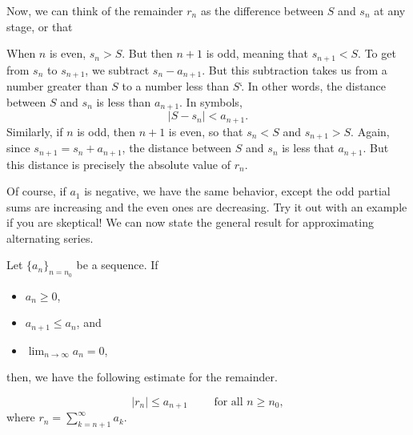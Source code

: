 \documentclass{ximera}
\begin{document}
\begin{model}
Now, we can think of the remainder $r_n$ as the difference between $S$ and $s_n$ at any stage, or that
\begin{image}
  \end{image}
When $n$ is even, $s_n > S$.  But then $n+1$ is odd, meaning that $s_{n+1} < S$.  To get from $s_n$ to $s_{n+1}$, we subtract $s_n - a_{n+1}$.  But this subtraction takes us from a number greater than $S$ to a number less than $S$`.  In other words, the distance between $S$ and $s_n$ is less than $a_{n+1}$.  In symbols, 
\[
\vert S - s_n \vert < a_{n+1}.
\]
Similarly, if $n$ is odd, then $n+1$ is even, so that $s_n < S$ and $s_{n+1} > S$.  Again, since $s_{n+1} = s_n + a_{n+1}$, the distance between $S$ and $s_n$ is less that $a_{n+1}$.  But this distance is precisely the absolute value of $r_n$.

\end{model}

Of course, if $a_1$ is negative, we have the same behavior, except the odd partial sums are increasing and the even ones are decreasing.  Try it out with an example if you are skeptical!  We can now state the general result for approximating alternating series.

\begin{theorem}
Let $\{a_n\}_{n=n_0}$ be a sequence.  If

\begin{itemize}
\item $a_n \geq 0$,
\item $a_{n+1} \leq a_n$, and
\item $\lim_{n \to\infty} a_n=0$, 
\end{itemize}

then, we have the following estimate for the remainder.

\[
\big| r_n \big| \leq a_{n+1} \qquad \textrm{ for all } n \geq n_0,
\]
where $r_n = \sum_{k=n+1}^{\infty} a_k$.
\end{theorem}
\end{document}
